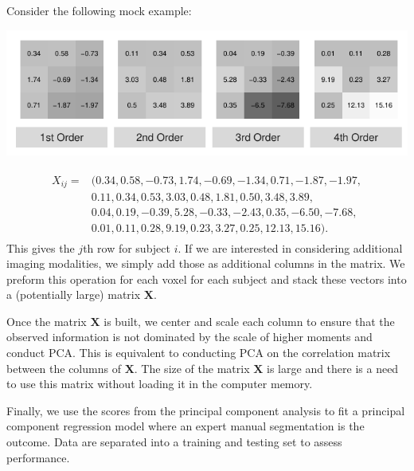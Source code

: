 \documentclass[a0,landscape]{a0poster}
\begin{document}
\begin{multicols}{3}
\hspace{1cm}Consider the following mock example:
\begin{center}\vspace{.5cm}
\includegraphics[width=1\linewidth]{ln_example_higherorder.pdf}
\end{center}\vspace{.5cm}
\normalsize{
\begin{align*}
\begin{aligned}
X_{ij} = &(0.34, 0.58, -0.73, 1.74, -0.69, -1.34, 0.71, -1.87, -1.97,\\
&0.11, 0.34, 0.53, 3.03, 0.48, 1.81, 0.50, 3.48, 3.89, \\
&0.04, 0.19, -0.39, 5.28, -0.33, -2.43, 0.35, -6.50, -7.68,\\
&0.01, 0.11, 0.28, 9.19, 0.23, 3.27, 0.25, 12.13, 15.16).
\end{aligned}
\end{align*}}
\large
\noindent This gives the $j$th row for subject $i$. If we are interested in considering additional imaging modalities, we simply add those as additional columns in the matrix. We preform this operation for each voxel for each subject and stack these vectors into a (potentially large) matrix $\mathbf{X}$.

\hspace{1cm} Once the matrix $\mathbf{X}$ is built, we center and scale each column to ensure that the observed information is not dominated by the scale of higher moments and conduct PCA. This is equivalent to conducting PCA on the correlation matrix between the columns of $\mathbf{X}$. The size of the matrix $\mathbf{X}$ is large and there is a need to use this matrix without loading it in the computer memory.

\hspace{1cm} Finally, we use the scores from the principal component analysis to fit a principal component regression model where an expert manual segmentation is the outcome. Data are separated into a training and testing set to assess performance.


\end{multicols}
\end{document}
